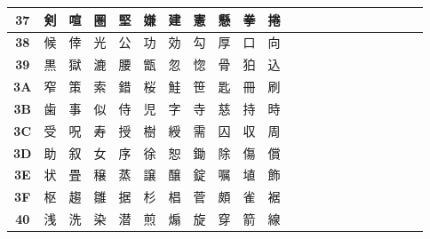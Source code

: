 \begin{table}[H]
\begin{tabular}{|Sc|Sc|Sc|Sc|Sc|Sc|Sc|Sc|Sc|Sc|Sc|}
\textbf{37} & 剣 & 喧 & 圏 & 堅 & 嫌 & 建 & 憲 & 懸 & 拳 & 捲 \\ \hline
\textbf{38} & 候 & 倖 & 光 & 公 & 功 & 効 & 勾 & 厚 & 口 & 向 \\ \hline
\textbf{39} & 黒 & 獄 & 漉 & 腰 & 甑 & 忽 & 惚 & 骨 & 狛 & 込 \\ \hline
\textbf{3A} & 窄 & 策 & 索 & 錯 & 桜 & 鮭 & 笹 & 匙 & 冊 & 刷 \\ \hline
\textbf{3B} & 歯 & 事 & 似 & 侍 & 児 & 字 & 寺 & 慈 & 持 & 時 \\ \hline
\textbf{3C} & 受 & 呪 & 寿 & 授 & 樹 & 綬 & 需 & 囚 & 収 & 周 \\ \hline
\textbf{3D} & 助 & 叙 & 女 & 序 & 徐 & 恕 & 鋤 & 除 & 傷 & 償 \\ \hline
\textbf{3E} & 状 & 畳 & 穣 & 蒸 & 譲 & 醸 & 錠 & 嘱 & 埴 & 飾 \\ \hline
\textbf{3F} & 枢 & 趨 & 雛 & 据 & 杉 & 椙 & 菅 & 頗 & 雀 & 裾 \\ \hline
\textbf{40} & 浅 & 洗 & 染 & 潜 & 煎 & 煽 & 旋 & 穿 & 箭 & 線 \\ \hline
\end{tabular}
\end{table}

